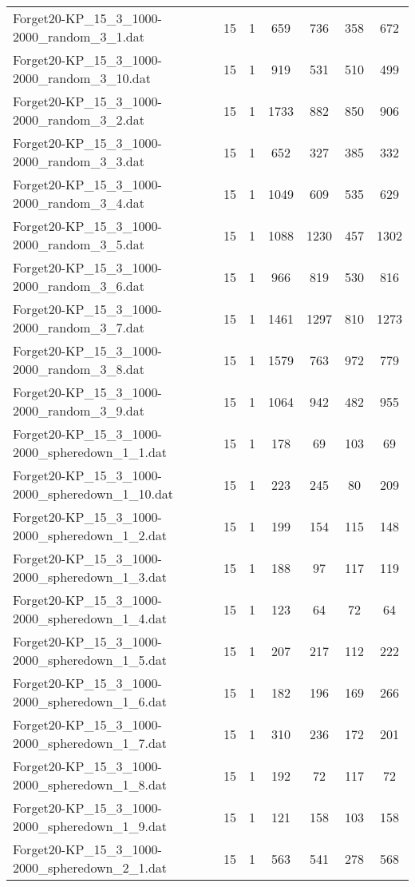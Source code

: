 \begin{table}[!ht]
\begin{tabular}{lcccccc}
Forget20-KP\_15\_3\_1000-2000\_random\_3\_1.dat & 15 & 1 & 659 & 736 & 358 & 672 \\
Forget20-KP\_15\_3\_1000-2000\_random\_3\_10.dat & 15 & 1 & 919 & 531 & 510 & 499 \\
Forget20-KP\_15\_3\_1000-2000\_random\_3\_2.dat & 15 & 1 & 1733 & 882 & 850 & 906 \\
Forget20-KP\_15\_3\_1000-2000\_random\_3\_3.dat & 15 & 1 & 652 & 327 & 385 & 332 \\
Forget20-KP\_15\_3\_1000-2000\_random\_3\_4.dat & 15 & 1 & 1049 & 609 & 535 & 629 \\
Forget20-KP\_15\_3\_1000-2000\_random\_3\_5.dat & 15 & 1 & 1088 & 1230 & 457 & 1302 \\
Forget20-KP\_15\_3\_1000-2000\_random\_3\_6.dat & 15 & 1 & 966 & 819 & 530 & 816 \\
Forget20-KP\_15\_3\_1000-2000\_random\_3\_7.dat & 15 & 1 & 1461 & 1297 & 810 & 1273 \\
Forget20-KP\_15\_3\_1000-2000\_random\_3\_8.dat & 15 & 1 & 1579 & 763 & 972 & 779 \\
Forget20-KP\_15\_3\_1000-2000\_random\_3\_9.dat & 15 & 1 & 1064 & 942 & 482 & 955 \\
Forget20-KP\_15\_3\_1000-2000\_spheredown\_1\_1.dat & 15 & 1 & 178 & 69 & 103 & 69 \\
Forget20-KP\_15\_3\_1000-2000\_spheredown\_1\_10.dat & 15 & 1 & 223 & 245 & 80 & 209 \\
Forget20-KP\_15\_3\_1000-2000\_spheredown\_1\_2.dat & 15 & 1 & 199 & 154 & 115 & 148 \\
Forget20-KP\_15\_3\_1000-2000\_spheredown\_1\_3.dat & 15 & 1 & 188 & 97 & 117 & 119 \\
Forget20-KP\_15\_3\_1000-2000\_spheredown\_1\_4.dat & 15 & 1 & 123 & 64 & 72 & 64 \\
Forget20-KP\_15\_3\_1000-2000\_spheredown\_1\_5.dat & 15 & 1 & 207 & 217 & 112 & 222 \\
Forget20-KP\_15\_3\_1000-2000\_spheredown\_1\_6.dat & 15 & 1 & 182 & 196 & 169 & 266 \\
Forget20-KP\_15\_3\_1000-2000\_spheredown\_1\_7.dat & 15 & 1 & 310 & 236 & 172 & 201 \\
Forget20-KP\_15\_3\_1000-2000\_spheredown\_1\_8.dat & 15 & 1 & 192 & 72 & 117 & 72 \\
Forget20-KP\_15\_3\_1000-2000\_spheredown\_1\_9.dat & 15 & 1 & 121 & 158 & 103 & 158 \\
Forget20-KP\_15\_3\_1000-2000\_spheredown\_2\_1.dat & 15 & 1 & 563 & 541 & 278 & 568 \\

\end{tabular}
\end{table}
